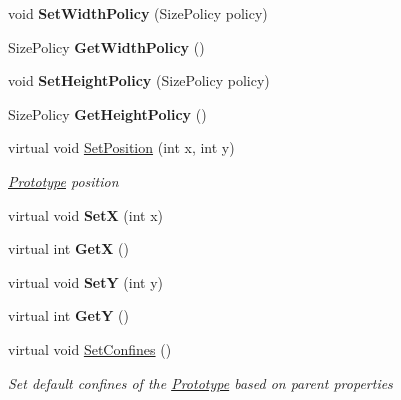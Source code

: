 \begin{DoxyCompactItemize}
\mbox{\label{class_space_v_i_l_1_1_prototype_a4a4e6f8a6b5716ed189acbdaedab1361}} 
void {\bfseries Set\+Width\+Policy} (Size\+Policy policy)
\item 
\mbox{\label{class_space_v_i_l_1_1_prototype_ab31c214319199a47b372130c44b95ba0}} 
Size\+Policy {\bfseries Get\+Width\+Policy} ()
\item 
\mbox{\label{class_space_v_i_l_1_1_prototype_a0aeca452bfc800cc699622d5d58cb20b}} 
void {\bfseries Set\+Height\+Policy} (Size\+Policy policy)
\item 
\mbox{\label{class_space_v_i_l_1_1_prototype_a0af844fee378d1a8f9d27a667558f15f}} 
Size\+Policy {\bfseries Get\+Height\+Policy} ()
\item 
virtual void \mbox{\hyperlink{class_space_v_i_l_1_1_prototype_a85ca4db19baa118edbb48eb93302a6b3}{Set\+Position}} (int x, int y)
\begin{DoxyCompactList}\small\item\em \mbox{\hyperlink{class_space_v_i_l_1_1_prototype}{Prototype}} position \end{DoxyCompactList}\item 
\mbox{\label{class_space_v_i_l_1_1_prototype_aab3faa479d644757467a5ffdd7804b8b}} 
virtual void {\bfseries SetX} (int x)
\item 
\mbox{\label{class_space_v_i_l_1_1_prototype_a68412539d75034d2ecfd6cb4d4edd9b1}} 
virtual int {\bfseries GetX} ()
\item 
\mbox{\label{class_space_v_i_l_1_1_prototype_a4a9b18b3946c7782bc06a859377362a4}} 
virtual void {\bfseries SetY} (int y)
\item 
\mbox{\label{class_space_v_i_l_1_1_prototype_a0395fe29a602379ca5b0d5b1b9b34168}} 
virtual int {\bfseries GetY} ()
\item 
virtual void \mbox{\hyperlink{class_space_v_i_l_1_1_prototype_af063fd80d51a3c42c8f43e0e97b6b809}{Set\+Confines}} ()
\begin{DoxyCompactList}\small\item\em Set default confines of the \mbox{\hyperlink{class_space_v_i_l_1_1_prototype}{Prototype}} based on parent properties \end{DoxyCompactList}\item 

\end{DoxyCompactItemize}
